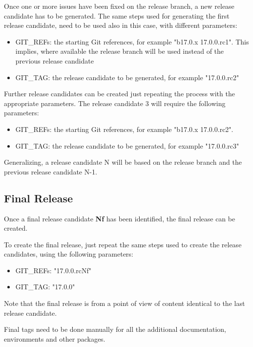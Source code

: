 Once one or more issues have been fixed on the release branch, a new release candidate has to be generated.
The same steps used for generating the first release candidate, need to be used also in this case, with different parameters:

\begin{itemize}
\item GIT\_REFs: the starting Git references, for example "b17.0.x 17.0.0.rc1". 
This implies, where available the release branch will be used instead of the previous release candidate
\item GIT\_TAG: the release candidate to be generated, for example "17.0.0.rc2"
\end{itemize}

Further release candidates can be created just repeating the process with the appropriate parameters.
The release candidate 3 will require the following parameters:

\begin{itemize}
\item GIT\_REFs: the starting Git references, for example "b17.0.x 17.0.0.rc2". 
\item GIT\_TAG: the release candidate to be generated, for example "17.0.0.rc3"
\end{itemize}

Generalizing, a release candidate N will be based on the release branch and the previous release candidate N-1.


\subsection{Final Release} \label{sec:finalrelease}

Once a final release candidate \textbf{Nf} has been identified, the final release can be created.

To create the final release, just repeat the same steps used to create the release candidates, using the following parameters:

\begin{itemize}
\item GIT\_REFs: "17.0.0.rcNf"
\item GIT\_TAG: "17.0.0"
\end{itemize}

Note that the final release is from a point of view of content identical to the last release candidate.

Final tags need to be done manually for all the additional documentation, environments and other packages.

